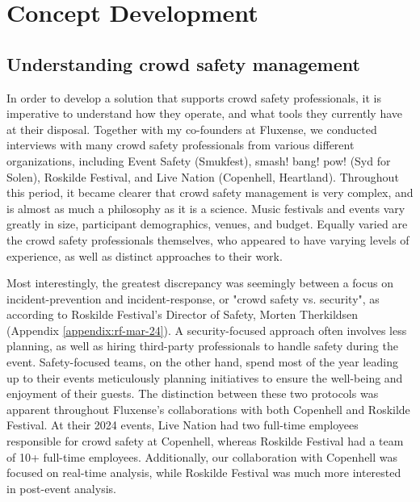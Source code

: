 \chapter{Concept Development}
\label{chap:concept-development}

\section{Understanding crowd safety management}
\label{sec:crowd-safety}

In order to develop a solution that supports crowd safety professionals, it is imperative to understand how they operate, and what tools they currently have at their disposal. Together with my co-founders at Fluxense, we conducted interviews with many crowd safety professionals from various different organizations, including Event Safety (Smukfest), smash! bang! pow! (Syd for Solen), Roskilde Festival, and Live Nation (Copenhell, Heartland). Throughout this period, it became clearer that crowd safety management is very complex, and is almost as much a philosophy as it is a science. Music festivals and events vary greatly in size, participant demographics, venues, and budget. Equally varied are the crowd safety professionals themselves, who appeared to have varying levels of experience, as well as distinct approaches to their work.

Most interestingly, the greatest discrepancy was seemingly between a focus on incident-prevention and incident-response, or "crowd safety vs. security", as according to Roskilde Festival's Director of Safety, Morten Therkildsen (Appendix \ref{appendix:rf-mar-24}). A security-focused approach often involves less planning, as well as hiring third-party professionals to handle safety during the event. Safety-focused teams, on the other hand, spend most of the year leading up to their events meticulously planning initiatives to ensure the well-being and enjoyment of their guests. The distinction between these two protocols was apparent throughout Fluxense's collaborations with both Copenhell and Roskilde Festival. At their 2024 events, Live Nation had two full-time employees responsible for crowd safety at Copenhell, whereas Roskilde Festival had a team of 10+ full-time employees. Additionally, our collaboration with Copenhell was focused on real-time analysis, while Roskilde Festival was much more interested in post-event analysis.

